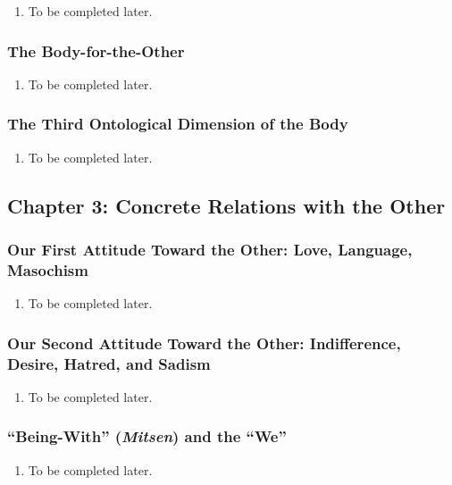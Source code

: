 \begin{enumerate}
  \item To be completed later.
\end{enumerate}

\subsubsection{The Body-for-the-Other}

\begin{enumerate}
  \item To be completed later.
\end{enumerate}

\subsubsection{The Third Ontological Dimension of the Body}

\begin{enumerate}
  \item To be completed later.
\end{enumerate}

\subsection{Chapter 3: Concrete Relations with the Other}

\subsubsection{Our First Attitude Toward the Other: Love, Language, Masochism}

\begin{enumerate}
  \item To be completed later.
\end{enumerate}

\subsubsection{Our Second Attitude Toward the Other: Indifference, Desire, Hatred, and Sadism}

\begin{enumerate}
  \item To be completed later.
\end{enumerate}

\subsubsection{\enquote{Being-With} (\emph{Mitsen}) and the \enquote{We}}

\begin{enumerate}
  \item To be completed later.
\end{enumerate}
